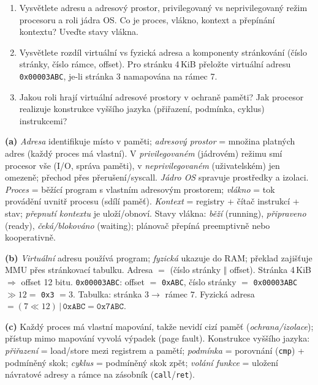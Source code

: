 \begin{zadani}
\begin{enumerate}[label=(\alph*)]
  \item {} Vysvětlete adresu a adresový prostor, privilegovaný vs neprivilegovaný režim procesoru a roli jádra OS. Co je proces, vlákno, kontext a přepínání kontextu? Uveďte stavy vlákna.
  \item {} Vysvětlete rozdíl virtuální vs fyzická adresa a komponenty stránkování (číslo stránky, číslo rámce, offset). Pro stránku 4\,KiB přeložte virtuální adresu \texttt{0x00003ABC}, je-li stránka 3 namapována na rámec 7.
  \item {} Jakou roli hrají virtuální adresové prostory v ochraně paměti? Jak procesor realizuje konstrukce vyššího jazyka (přiřazení, podmínka, cyklus) instrukcemi?
\end{enumerate}
\end{zadani}

\begin{reseni}
\textbf{(a)} \emph{Adresa} identifikuje místo v paměti; \emph{adresový prostor} = množina platných adres (každý proces má vlastní). V \emph{privilegovaném} (jádrovém) režimu smí procesor vše (I/O, správa paměti), v \emph{neprivilegovaném} (uživatelském) jen omezeně; přechod přes přerušení/syscall. \emph{Jádro OS} spravuje prostředky a izolaci. \emph{Proces} = běžící program s vlastním adresovým prostorem; \emph{vlákno} = tok provádění uvnitř procesu (sdílí paměť). \emph{Kontext} = registry + čítač instrukcí + stav; \emph{přepnutí kontextu} je uloží/obnoví. Stavy vlákna: \emph{běží} (running), \emph{připraveno} (ready), \emph{čeká/blokováno} (waiting); plánovač přepíná preemptivně nebo kooperativně.

\textbf{(b)} \emph{Virtuální} adresu používá program; \emph{fyzická} ukazuje do RAM; překlad zajišťuje MMU přes stránkovací tabulku. Adresa $=$ (číslo stránky $\Vert$ offset). Stránka 4\,KiB $\Rightarrow$ offset 12 bitu. \texttt{0x00003ABC}: offset $=$ \texttt{0xABC}, číslo stránky $=$ \texttt{0x00003ABC}$\gg12=$ \texttt{0x3} $=3$. Tabulka: stránka $3\to$ rámec $7$. Fyzická adresa $=(7\ll12)\,\vert\,\texttt{0xABC}=\texttt{0x7ABC}$.

\textbf{(c)} Každý proces má vlastní mapování, takže nevidí cizí paměť (\emph{ochrana/izolace}); přístup mimo mapování vyvolá výpadek (page fault). Konstrukce vyššího jazyka: \emph{přiřazení} = load/store mezi registrem a pamětí; \emph{podmínka} = porovnání (\texttt{cmp}) + podmíněný skok; \emph{cyklus} = podmíněný skok zpět; \emph{volání funkce} = uložení návratové adresy a rámce na zásobník (\texttt{call}/\texttt{ret}).
\end{reseni}

